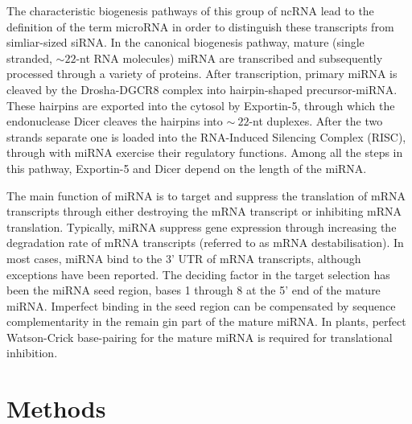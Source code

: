 \documentclass{article}
\begin{document}
The characteristic biogenesis pathways of this group of ncRNA lead to the definition of the term microRNA in order to distinguish these transcripts from simliar-sized siRNA. In the canonical biogenesis pathway, mature (single stranded, $\sim22$-nt RNA molecules) miRNA are transcribed and subsequently processed through a variety of proteins. After transcription, primary miRNA is cleaved by the Drosha-DGCR8 complex into hairpin-shaped precursor-miRNA. These hairpins are exported into the cytosol by Exportin-5, through which the endonuclease Dicer cleaves the hairpins into $\sim~22$-nt duplexes. After the two strands separate one is loaded into the RNA-Induced Silencing Complex (RISC), through with miRNA exercise their regulatory functions. Among all the steps in this pathway, Exportin-5 and Dicer depend on the length of the miRNA.

The main function of miRNA is to target and suppress the translation of mRNA transcripts through either destroying the mRNA transcript or inhibiting mRNA translation. Typically, miRNA suppress gene expression through increasing the degradation rate of mRNA transcripts (referred to as mRNA destabilisation). In most cases, miRNA bind to the 3' UTR of mRNA transcripts, although exceptions have been reported. The deciding factor in the target selection has been the miRNA seed region, bases 1 through 8 at the 5' end of the mature miRNA. Imperfect binding in the seed region can be compensated by sequence complementarity in the remain gin part of the mature miRNA. In plants, perfect Watson-Crick base-pairing for the mature miRNA is required for translational inhibition.


\section{Methods}\label{method}
\end{document}
